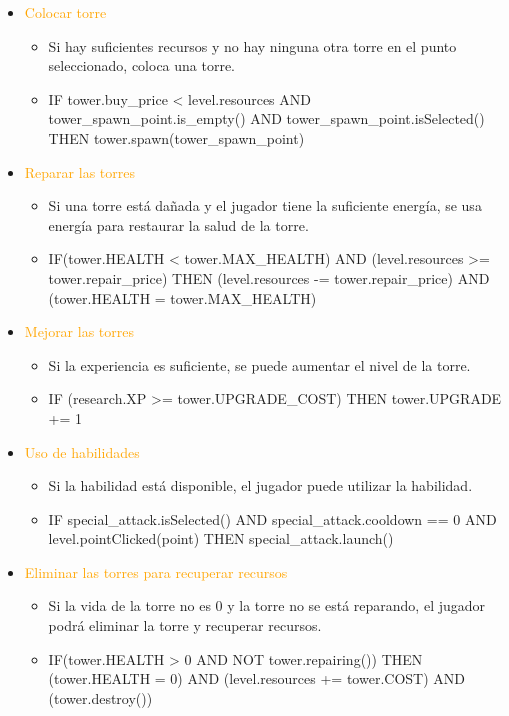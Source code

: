 \documentclass{article}
\begin{document}
\begin{itemize}
    \item \textcolor{Orange}{Colocar torre}
    \begin{itemize}
        \item Si hay suficientes recursos y no hay ninguna otra torre en el punto seleccionado, coloca una torre.
        \item IF tower.buy\_price < level.resources AND tower\_spawn\_point.is\_empty() AND \break tower\_spawn\_point.isSelected() THEN tower.spawn(tower\_spawn\_point)
    \end{itemize}
    \item \textcolor{Orange}{Reparar las torres}
    \begin{itemize}
        \item Si una torre está dañada y el jugador tiene la suficiente energía, se usa energía para restaurar la salud de la torre.
        \item IF(tower.HEALTH < tower.MAX\_HEALTH) AND (level.resources >= tower.repair\_price) THEN (level.resources -= tower.repair\_price)  AND (tower.HEALTH = tower.MAX\_HEALTH)
    \end{itemize}
    \item \textcolor{Orange}{Mejorar las torres}
    \begin{itemize}
        \item Si la experiencia es suficiente, se puede aumentar el nivel de la torre.
        \item IF (research.XP  >= tower.UPGRADE\_COST) THEN tower.UPGRADE += 1
    \end{itemize}
    \item \textcolor{Orange}{Uso de habilidades}
    \begin{itemize}
        \item Si la habilidad está disponible, el jugador puede utilizar la habilidad.
        \item IF special\_attack.isSelected() AND special\_attack.cooldown == 0 AND \break level.pointClicked(point) THEN special\_attack.launch()
    \end{itemize}
    \item \textcolor{Orange}{Eliminar las torres para recuperar recursos}
    \begin{itemize}
        \item Si la vida de la torre no es 0 y la torre no se está reparando, el jugador podrá eliminar la torre y recuperar recursos.
        \item IF(tower.HEALTH > 0 AND NOT tower.repairing()) THEN (tower.HEALTH = 0) AND \break (level.resources += tower.COST) AND (tower.destroy())

\end{itemize}
\end{itemize}
\end{document}
